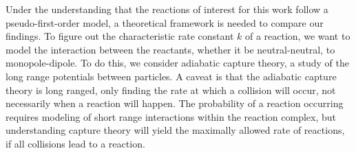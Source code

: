 Under the understanding that the reactions of interest for this work follow a pseudo-first-order model, a theoretical framework is needed to compare our findings. To figure out the characteristic rate constant $k$ of a reaction, we want to model the interaction between the reactants, whether it be neutral-neutral, to monopole-dipole. To do this, we consider adiabatic capture theory, a study of the long range potentials between particles. A caveat is that the adiabatic capture theory is long ranged, only finding the rate at which a collision will occur, not necessarily when a reaction will happen. The probability of a reaction occurring requires modeling of short range interactions within the reaction complex, but understanding capture theory will yield the maximally allowed rate of reactions, if all collisions lead to a reaction.